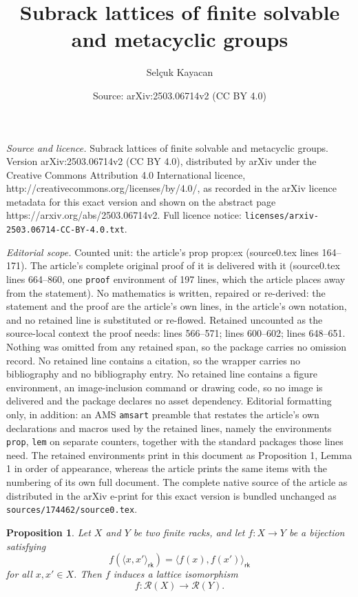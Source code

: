 \documentclass[10pt,a4paper]{amsart}
\title{Subrack lattices of finite solvable and metacyclic groups}
\author{Sel\c{c}uk Kayacan}
\date{Source: arXiv:2503.06714v2 (CC BY 4.0)}
\newtheorem{prop}{Proposition}
\begin{document}
\maketitle

\noindent\emph{Source and licence.} Subrack lattices of finite solvable and metacyclic groups. Version arXiv:2503.06714v2 (CC BY 4.0), distributed by arXiv under the Creative Commons Attribution 4.0 International licence, http://creativecommons.org/licenses/by/4.0/, as recorded in the arXiv licence metadata for this exact version and shown on the abstract page https://arxiv.org/abs/2503.06714v2. Full licence notice: \texttt{licenses/arxiv-2503.06714-CC-BY-4.0.txt}.\par\smallskip

\noindent\textit{Editorial scope.} Counted unit: the article's prop prop:ex (source0.tex lines 164--171). The article's complete original proof of it is delivered with it (source0.tex lines 664--860, one \texttt{proof} environment of 197 lines, which the article places away from the statement). No mathematics is written, repaired or re-derived: the statement and the proof are the article's own lines, in the article's own notation, and no retained line is substituted or re-flowed.  Retained uncounted as the source-local context the proof needs: lines 566--571; lines 600--602; lines 648--651.  Nothing was omitted from any retained span, so the package carries no omission record.  No retained line contains a citation, so the wrapper carries no bibliography and no bibliography entry.  No retained line contains a figure environment, an image-inclusion command or drawing code, so no image is delivered and the package declares no asset dependency.  Editorial formatting only, in addition: an AMS \texttt{amsart} preamble that restates the article's own declarations and macros used by the retained lines, namely the environments \texttt{prop}, \texttt{lem} on separate counters, together with the standard packages those lines need.  The retained environments print in this document as Proposition 1, Lemma 1 in order of appearance, whereas the article prints the same items with the numbering of its own full document.  The complete native source of the article as distributed in the arXiv e-print for this exact version is bundled unchanged as \texttt{sources/174462/source0.tex}.
\begin{prop}\label{prop:pairs}
  Let $X$ and $Y$ be two finite racks, and let $f\colon X\to Y$ be a bijection satisfying
  $$ f(\langle x,x'\rangle_{\mathsf{rk}}) = \langle f(x),f(x')\rangle_{\mathsf{rk}} $$
  for all $x,x'\in X$. Then $f$ induces a lattice isomorphism
  $$ f\colon\mathcal{R}(X)\to \mathcal{R}(Y). $$
\end{prop}
\end{document}
